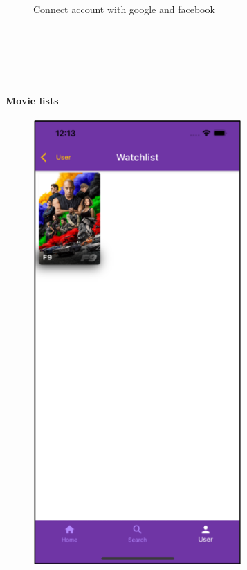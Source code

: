 \documentclass[12pt, a4paper]{article}
\numberwithin{figure}{section}
\begin{document}
\begin{center}
\begin{minipage}[t]{0.46\textwidth}
\begin{figure}[H]
			\caption{Connect account with google and facebook}
		\end{figure}
	\end{minipage}
\end{center}

\mbox{}\\\\\\\\

\paragraph{Movie lists}

\begin{center}
	\begin{minipage}[t]{0.31\textwidth}
		\begin{figure}[H]
			\centering
			\includegraphics[width=0.71\textwidth]{images/final/watchlist.png}\\

\end{figure}
\end{minipage}
\end{center}
\end{document}
